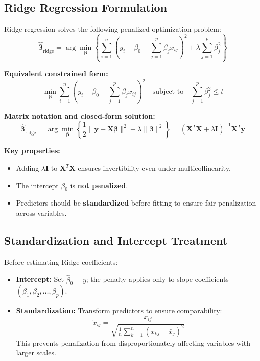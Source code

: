 \documentclass{article}
\begin{document}
\subsection{Ridge Regression Formulation}
Ridge regression solves the following penalized optimization problem:
$$\hat{\boldsymbol{\beta}}_{\text{ridge}} = \arg\min_{\boldsymbol{\beta}} \left\{ \sum_{i=1}^{n} \left( y_i - \beta_0 - \sum_{j=1}^{p} \beta_j x_{ij} \right)^2 + \lambda \sum_{j=1}^{p} \beta_j^2 \right\}$$

\noindent\textbf{Equivalent constrained form:}
$$\min_{\boldsymbol{\beta}} \sum_{i=1}^{n} \left( y_i - \beta_0 - \sum_{j=1}^{p} \beta_j x_{ij} \right)^2 \quad \text{subject to} \quad \sum_{j=1}^{p} \beta_j^2 \le t$$

\noindent\textbf{Matrix notation and closed-form solution:}
$$\hat{\boldsymbol{\beta}}_{\text{ridge}} = \arg\min_{\boldsymbol{\beta}} \left\{ \frac{1}{2} \|\mathbf{y} - \mathbf{X}\boldsymbol{\beta}\|^2 + \lambda \|\boldsymbol{\beta}\|^2 \right\} = (\mathbf{X}^T\mathbf{X} + \lambda \mathbf{I})^{-1} \mathbf{X}^T \mathbf{y}$$

\noindent\textbf{Key properties:}
\begin{itemize}
    \item Adding $\lambda \mathbf{I}$ to $\mathbf{X}^T\mathbf{X}$ ensures invertibility even under multicollinearity.
    \item The intercept $\beta_0$ is \textbf{not penalized}.
    \item Predictors should be \textbf{standardized} before fitting to ensure fair penalization across variables.
\end{itemize}

\subsection{Standardization and Intercept Treatment}
Before estimating Ridge coefficients:
\begin{itemize}
    \item \textbf{Intercept:} Set $\hat{\beta}_0 = \bar{y}$; the penalty applies only to slope coefficients $(\beta_1, \beta_2, \dots, \beta_p)$.
    \item \textbf{Standardization:} Transform predictors to ensure comparability:
    $$\tilde{x}_{ij} = \frac{x_{ij}}{\sqrt{\frac{1}{n} \sum_{k=1}^{n} (x_{kj} - \bar{x}_j)^2}}$$
    This prevents penalization from disproportionately affecting variables with larger scales.
\end{itemize}
\end{document}
